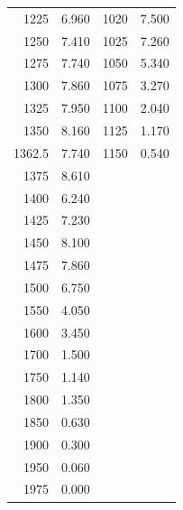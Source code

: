 \documentclass[english,11pt,a4paper]{article}
\begin{document}
\begin{table}[H]
\begin{tabular}{rr|rr}
				1225             & 6.960      & 1020                 & 7.500                \\
				1250             & 7.410      & 1025                 & 7.260                \\
				1275             & 7.740      & 1050                 & 5.340                \\
				1300             & 7.860      & 1075                 & 3.270                \\
				1325             & 7.950      & 1100                 & 2.040                \\
				1350             & 8.160      & 1125                 & 1.170                \\
				1362.5           & 7.740      & 1150                 & 0.540                \\
				1375             & 8.610      & \multicolumn{1}{l}{} & \multicolumn{1}{l}{} \\
				1400             & 6.240      & \multicolumn{1}{l}{} & \multicolumn{1}{l}{} \\
				1425             & 7.230      & \multicolumn{1}{l}{} & \multicolumn{1}{l}{} \\
				1450             & 8.100      & \multicolumn{1}{l}{} & \multicolumn{1}{l}{} \\
				1475             & 7.860      & \multicolumn{1}{l}{} & \multicolumn{1}{l}{} \\
				1500             & 6.750      & \multicolumn{1}{l}{} & \multicolumn{1}{l}{} \\
				1550             & 4.050      & \multicolumn{1}{l}{} & \multicolumn{1}{l}{} \\
				1600             & 3.450      & \multicolumn{1}{l}{} & \multicolumn{1}{l}{} \\
				1700             & 1.500      & \multicolumn{1}{l}{} & \multicolumn{1}{l}{} \\
				1750             & 1.140      & \multicolumn{1}{l}{} & \multicolumn{1}{l}{} \\
				1800             & 1.350      & \multicolumn{1}{l}{} & \multicolumn{1}{l}{} \\
				1850             & 0.630      & \multicolumn{1}{l}{} & \multicolumn{1}{l}{} \\
				1900             & 0.300      & \multicolumn{1}{l}{} & \multicolumn{1}{l}{} \\
				1950             & 0.060      & \multicolumn{1}{l}{} & \multicolumn{1}{l}{} \\
				1975             & 0.000      & \multicolumn{1}{l}{} & \multicolumn{1}{l}{} \\ 
			\end{tabular}
		\end{table}

		

	\printbibliography
		
		
\end{document}
